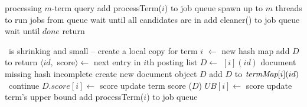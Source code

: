 
\begin{algorithm*}[tbh]
\small
\begin{multicols}{2}
\begin{algorithmic}[1]
 \Comment processing $m$-term query
\State add {\sc processTerm($i$)} to job queue \label{l:par-init-job}
\EndFor
\State spawn up to $m$  threads to run jobs from queue\label{l:start-threads}
\State wait until \RAStop
	\Comment all candidates  are in \DMap
\State add {\sc cleaner()} to job queue %
\State wait until $done$
\State return \DHeap \label{l:par-end}
%

\Statex 
{} 
	\If{\RAStop\, $\wedge\, |\DMap | < \Phi \, \wedge\  \TMap[i]=\DMap$} \label{l:hash-start}
			\Statex \Comment  \DMap\  is shrinking and small -- create a local copy for term $i$
			\State \TMap[i] $\leftarrow$ new hash map
            			\State add $D$ to \TMap[i] \label{l:hash-chash}
            		\EndFor
	\EndIf \label{l:hash-end}
		 return \EndIf
    		\State $\langle id,$ score$\rangle \leftarrow$ next entry in $i$th posting list
		\State $D \leftarrow$ \TMap$[i](id)$
 	  		 \Comment document missing 
 	  			\If{$\neg$\RAStop} \Comment hash incomplete
		 			\State create new document object $D$
 					\State add $D$ to $\textit{termMap}[i](id)$
				\Else\ continue
				\EndIf
    			\EndIf
        			\State $D.score[i] \leftarrow$ score \Comment update term  score
				($D$)
			\EndIf	
	\EndFor %
	\State $UB[i] \leftarrow$ score \Comment update term's upper bound \label{l:thread-update-ub}    
	\State add {\sc processTerm($i$)} to job queue \label{l:new-task}
\EndProcedure


\end{algorithmic}
\end{multicols}
\end{algorithm*}
